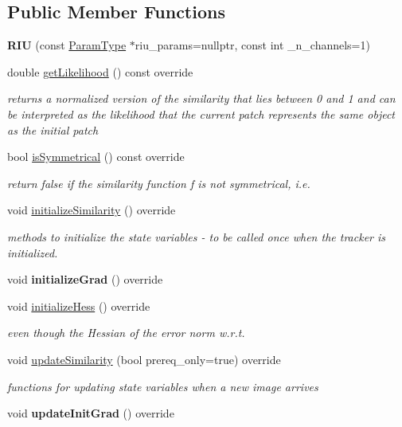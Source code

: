 \subsection*{Public Member Functions}
\begin{DoxyCompactItemize}
\item 
\hypertarget{classRIU_adc5f910c2160237fdc79f6d4c0573383}{{\bfseries R\-I\-U} (const \hyperlink{structRIUParams}{Param\-Type} $\ast$riu\-\_\-params=nullptr, const int \-\_\-n\-\_\-channels=1)}\label{classRIU_adc5f910c2160237fdc79f6d4c0573383}

\item 
\hypertarget{classRIU_a9c267aca6423c1b34d232dd20d0fed61}{double \hyperlink{classRIU_a9c267aca6423c1b34d232dd20d0fed61}{get\-Likelihood} () const override}\label{classRIU_a9c267aca6423c1b34d232dd20d0fed61}

\begin{DoxyCompactList}\small\item\em returns a normalized version of the similarity that lies between 0 and 1 and can be interpreted as the likelihood that the current patch represents the same object as the initial patch \end{DoxyCompactList}\item 
bool \hyperlink{classRIU_affdd09cd84537d1eaa57701ee86f0b1c}{is\-Symmetrical} () const override
\begin{DoxyCompactList}\small\item\em return false if the similarity function f is not symmetrical, i.\-e. \end{DoxyCompactList}\item 
void \hyperlink{classRIU_a5ccf1a37fe26c103aa57b5aadd0381dd}{initialize\-Similarity} () override
\begin{DoxyCompactList}\small\item\em methods to initialize the state variables -\/ to be called once when the tracker is initialized. \end{DoxyCompactList}\item 
\hypertarget{classRIU_ad81eb0a60fa2f1d696c09ce81eba8e36}{void {\bfseries initialize\-Grad} () override}\label{classRIU_ad81eb0a60fa2f1d696c09ce81eba8e36}

\item 
void \hyperlink{classRIU_acc482462a416c69dc5eab4cc1be379f5}{initialize\-Hess} () override
\begin{DoxyCompactList}\small\item\em even though the Hessian of the error norm w.\-r.\-t. \end{DoxyCompactList}\item 
void \hyperlink{classRIU_a321095af97c9e2862a099ea1293ad676}{update\-Similarity} (bool prereq\-\_\-only=true) override
\begin{DoxyCompactList}\small\item\em functions for updating state variables when a new image arrives \end{DoxyCompactList}\item 
\hypertarget{classRIU_a97ff43002844d6fb9edaa8c0ae98ec47}{void {\bfseries update\-Init\-Grad} () override}\label{classRIU_a97ff43002844d6fb9edaa8c0ae98ec47}


\end{DoxyCompactItemize}
